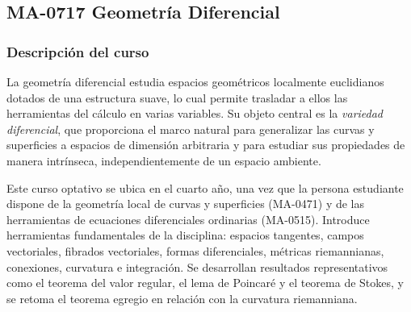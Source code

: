 \newpage
\subsection*{MA-0717 Geometría Diferencial}

\hypertarget{MA0717}{}
\begin{refsection}
\begin{table}[H]
\end{table}

\subsubsection*{Descripción del curso}

La geometría diferencial estudia espacios geométricos localmente euclidianos dotados de una estructura suave, lo cual permite trasladar a ellos las herramientas del cálculo en varias variables. Su objeto central es la \emph{variedad diferencial}, que proporciona el marco natural para generalizar las curvas y superficies a espacios de dimensión arbitraria y para estudiar sus propiedades de manera intrínseca, independientemente de un espacio ambiente.

Este curso optativo se ubica en el cuarto año, una vez que la persona estudiante dispone de la geometría local de curvas y superficies (MA-0471) y de las herramientas de ecuaciones diferenciales ordinarias (MA-0515). Introduce herramientas fundamentales de la disciplina: espacios tangentes, campos vectoriales, fibrados vectoriales, formas diferenciales, métricas riemannianas, conexiones, curvatura e integración. Se desarrollan resultados representativos como el teorema del valor regular, el lema de Poincaré y el teorema de Stokes, y se retoma el teorema egregio en relación con la curvatura riemanniana.


\end{refsection}
